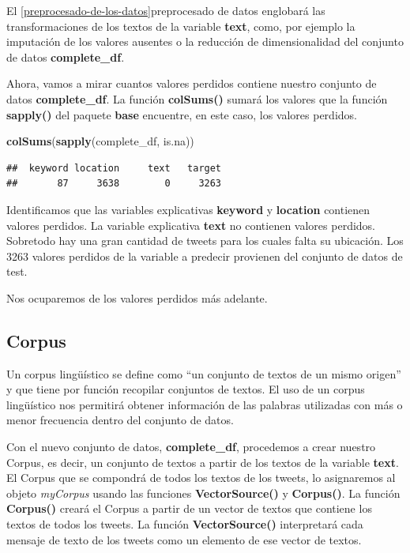 \documentclass[]{article}
\newenvironment{Shaded}{\begin{snugshade}}{\end{snugshade}}
\newcommand{\KeywordTok}[1]{\textcolor[rgb]{0.13,0.29,0.53}{\textbf{#1}}}
\newcommand{\NormalTok}[1]{#1}
\begin{document}
El \ref{preprocesado-de-los-datos}{preprocesado de datos} englobará las transformaciones de los textos de la variable \textbf{text}, como, por ejemplo la imputación de los valores ausentes o la reducción de
dimensionalidad del conjunto de datos \textbf{complete\_df}.

Ahora, vamos a mirar cuantos valores perdidos contiene nuestro conjunto de
datos \textbf{complete\_df}. La función \textbf{colSums()} sumará los
valores que la función \textbf{sapply()} del paquete \textbf{base} encuentre, en este caso, los
valores perdidos.

\vspace{3mm}

\begin{Shaded}
\begin{Highlighting}[]
\KeywordTok{colSums}\NormalTok{(}\KeywordTok{sapply}\NormalTok{(complete_df, is.na))}
\end{Highlighting}
\end{Shaded}

\begin{verbatim}
##  keyword location     text   target 
##       87     3638        0     3263
\end{verbatim}

Identificamos que las variables explicativas \textbf{keyword} y
\textbf{location} contienen valores perdidos. La variable explicativa
\textbf{text} no contienen valores perdidos. Sobretodo hay una gran cantidad
de tweets para los cuales falta su ubicación. Los 3263 valores perdidos
de la variable a predecir provienen del conjunto de datos de test. 

Nos ocuparemos de los valores perdidos más adelante.

\hypertarget{corpus}{%
\subsection{Corpus}\label{corpus}}

\begin{tcolorbox}
	Un corpus lingüístico se define como ``un conjunto de textos de un
	mismo origen'' y que tiene por función recopilar conjuntos de textos.
	El uso de un corpus lingüístico nos permitirá obtener información de las
	palabras utilizadas con más o menor frecuencia dentro del conjunto de datos.
\end{tcolorbox}

Con el nuevo conjunto de datos, \textbf{complete\_df},
procedemos a crear nuestro Corpus, es decir, un conjunto de textos a partir de los textos de la
variable \textbf{text}. El Corpus que se
compondrá de todos los textos de los tweets, lo asignaremos al objeto
\emph{myCorpus} usando las funciones \textbf{VectorSource()} y
\textbf{Corpus()}. La función \textbf{Corpus()} creará el Corpus a partir de un vector de textos que contiene los textos de todos los tweets. La función \textbf{VectorSource()} interpretará cada
mensaje de texto de los tweets como un elemento de ese vector de textos.
\end{document}
